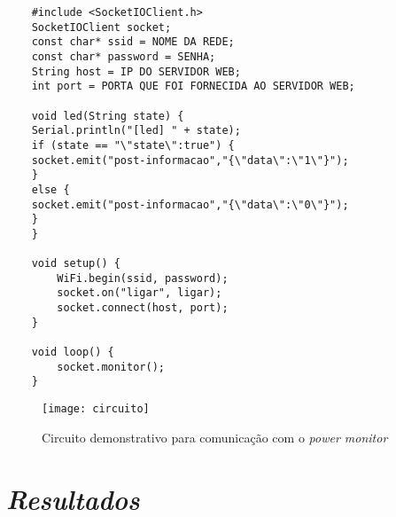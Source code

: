 \begin{lstlisting}
	#include <SocketIOClient.h>
	SocketIOClient socket;
	const char* ssid = NOME DA REDE;
	const char* password = SENHA;
	String host = IP DO SERVIDOR WEB;
	int port = PORTA QUE FOI FORNECIDA AO SERVIDOR WEB;	

	void led(String state) {
	Serial.println("[led] " + state);
	if (state == "\"state\":true") {
	socket.emit("post-informacao","{\"data\":\"1\"}");
	}
	else {
	socket.emit("post-informacao","{\"data\":\"0\"}");
	}
	}

	void setup() {
		WiFi.begin(ssid, password);
  		socket.on("ligar", ligar);  
  		socket.connect(host, port);
	}

	void loop() {
  		socket.monitor();    
	}
\end{lstlisting}


\addtocounter{footnote}{-2}
\addtocounter{footnote}{1}
\addtocounter{footnote}{1}


\begin{figure}[h!]
	\texttt{[image: circuito]}
	\centering
	\caption[Circuito demonstrativo para comunicação com o \textit{power monitor}]{Circuito demonstrativo para comunicação com o \textit{power monitor}}
	\label{fig:circuito} 
\end{figure}
\FloatBarrier

\section[\textit{Resultados}]{\textit{Resultados}}\label{resultados-sec}
